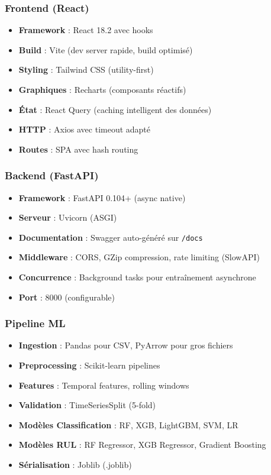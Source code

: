 \documentclass[12pt,a4paper,french]{article}
\begin{document}
\subsubsection{Frontend (React)}

\begin{itemize}
    \item \textbf{Framework} : React 18.2 avec hooks
    \item \textbf{Build} : Vite (dev server rapide, build optimisé)
    \item \textbf{Styling} : Tailwind CSS (utility-first)
    \item \textbf{Graphiques} : Recharts (composants réactifs)
    \item \textbf{État} : React Query (caching intelligent des données)
    \item \textbf{HTTP} : Axios avec timeout adapté
    \item \textbf{Routes} : SPA avec hash routing
\end{itemize}

\subsubsection{Backend (FastAPI)}

\begin{itemize}
    \item \textbf{Framework} : FastAPI 0.104+ (async native)
    \item \textbf{Serveur} : Uvicorn (ASGI)
    \item \textbf{Documentation} : Swagger auto-généré sur \texttt{/docs}
    \item \textbf{Middleware} : CORS, GZip compression, rate limiting (SlowAPI)
    \item \textbf{Concurrence} : Background tasks pour entraînement asynchrone
    \item \textbf{Port} : 8000 (configurable)
\end{itemize}

\subsubsection{Pipeline ML}

\begin{itemize}
    \item \textbf{Ingestion} : Pandas pour CSV, PyArrow pour gros fichiers
    \item \textbf{Preprocessing} : Scikit-learn pipelines
    \item \textbf{Features} : Temporal features, rolling windows
    \item \textbf{Validation} : TimeSeriesSplit (5-fold)
    \item \textbf{Modèles Classification} : RF, XGB, LightGBM, SVM, LR
    \item \textbf{Modèles RUL} : RF Regressor, XGB Regressor, Gradient Boosting
    \item \textbf{Sérialisation} : Joblib (.joblib)
\end{itemize}
\end{document}

